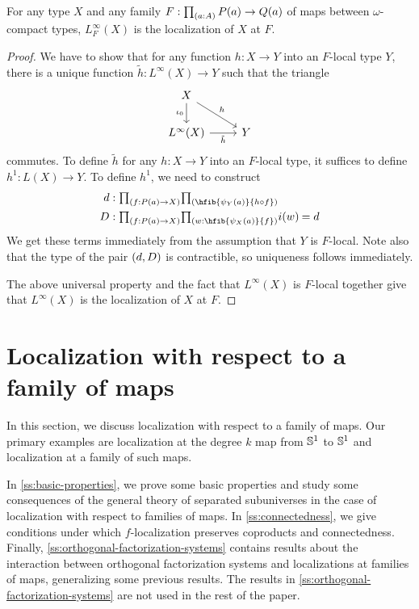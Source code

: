 \begin{thm}
For any type $X$ and any family $F:\prd{a:A}P(a)\to Q(a)$ of maps between
$\omega$-compact types, $L_F^\infty(X)$ is the localization of $X$ at $F$.
\end{thm}

\begin{proof}
We have to show that for any function $h:X\to Y$ into an
$F$-local type $Y$, there is a unique function $\tilde{h}: L^\infty(X)\to
Y$ such that the triangle
\begin{equation*}
\begin{tikzcd}
X \arrow[dr,"h"] \arrow[d,swap,"\iota_0"] \\ 
L^\infty(X) \arrow[r,swap,"\tilde{h}"] & Y
\end{tikzcd}
\end{equation*}
commutes. To define $\tilde{h}$ for any $h:X\to Y$ into an $F$-local type, 
it suffices to define $h^1:L(X)\to Y$. To define $h^1$, we need to construct
\begin{align*}
d & : \prd{f:P(a)\to X} \hfib{\psi_Y(a)}{h\circ f}\\
D & : \prd{f:P(a)\to X}{w:\hfib{\psi_{X}(a)}{f}}\id{i(w)}{d}
\end{align*}
We get these terms immediately from the assumption that $Y$ is $F$-local.
Note also that the type of the pair ${\mathopen{}(d,D)\mathclose{}}$ is contractible, so uniqueness
follows immediately.

The above universal property and the fact that $L^\infty(X)$ is $F$-local
together give that $L^\infty(X)$ is the localization of $X$ at $F$.
\end{proof}

\section{Localization with respect to a family of maps}\label{section:localization}

In this section, we discuss localization with respect to a family of maps.
Our primary examples are localization at the degree $k$ map from $\mathbb{S}^{1}$ to $\mathbb{S}^{1}$
and localization at a family of such maps.

In \cref{ss:basic-properties}, we prove some basic properties and study some consequences
of the general theory of separated subuniverses in the case of localization with respect to families of maps.
In \cref{ss:connectedness}, we give conditions under which
$f$-localization preserves coproducts and connectedness.
Finally, \cref{ss:orthogonal-factorization-systems} contains results about the interaction between
orthogonal factorization systems and localizations at families of maps, generalizing some
previous results. The results in \cref{ss:orthogonal-factorization-systems} are not used in the rest
of the paper.

